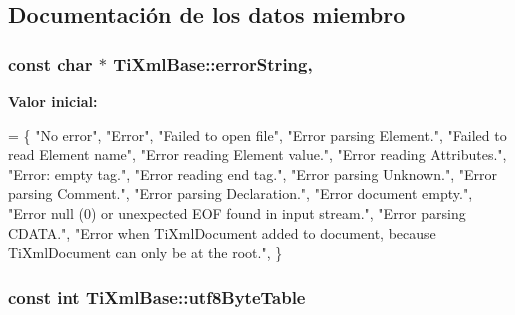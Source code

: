 \subsection{Documentación de los datos miembro}
\hypertarget{class_ti_xml_base_a7ac8feec4100e446b3d78e1ac0659700}{
\subsubsection[{error\-String}]{\setlength{\rightskip}{0pt plus 5cm}const char $\ast$ Ti\-Xml\-Base\-::error\-String\hspace{0.3cm}{\ttfamily [static]}, {\ttfamily [protected]}}}\label{class_ti_xml_base_a7ac8feec4100e446b3d78e1ac0659700}
{\bfseries Valor inicial\-:}
\begin{DoxyCode}
=
\{
    \textcolor{stringliteral}{"No error"},
    \textcolor{stringliteral}{"Error"},
    \textcolor{stringliteral}{"Failed to open file"},
    \textcolor{stringliteral}{"Error parsing Element."},
    \textcolor{stringliteral}{"Failed to read Element name"},
    \textcolor{stringliteral}{"Error reading Element value."},
    \textcolor{stringliteral}{"Error reading Attributes."},
    \textcolor{stringliteral}{"Error: empty tag."},
    \textcolor{stringliteral}{"Error reading end tag."},
    \textcolor{stringliteral}{"Error parsing Unknown."},
    \textcolor{stringliteral}{"Error parsing Comment."},
    \textcolor{stringliteral}{"Error parsing Declaration."},
    \textcolor{stringliteral}{"Error document empty."},
    \textcolor{stringliteral}{"Error null (0) or unexpected EOF found in input stream."},
    \textcolor{stringliteral}{"Error parsing CDATA."},
    \textcolor{stringliteral}{"Error when TiXmlDocument added to document, because TiXmlDocument can only be at the root."},
\}
\end{DoxyCode}
\hypertarget{class_ti_xml_base_ac8c86058137bdb4b413c3eca58f2d467}{
\subsubsection[{utf8\-Byte\-Table}]{\setlength{\rightskip}{0pt plus 5cm}const int Ti\-Xml\-Base\-::utf8\-Byte\-Table\hspace{0.3cm}{\ttfamily [static]}}}\label{class_ti_xml_base_ac8c86058137bdb4b413c3eca58f2d467}
